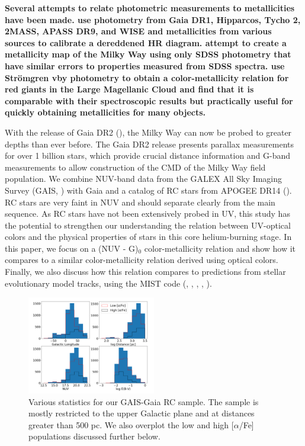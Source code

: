 \documentclass[twocolumn]{emulateapj}
\begin{document}
\textbf{Several attempts to relate photometric measurements to metallicities have been made. \citealt{ruiz18} use photometry from Gaia DR1, Hipparcos, Tycho 2, 2MASS, APASS DR9, and WISE and metallicities from various sources to calibrate a dereddened HR diagram. \citealt{ivezic2008} attempt to create a metallicity map of the Milky Way using only SDSS photometry that have similar errors to properties measured from SDSS spectra. \citealt{cole2000} use Str\"{o}mgren vby photometry to obtain a color-metallicity relation for red giants in the Large Magellanic Cloud and find that it is comparable with their spectroscopic results but practically useful for quickly obtaining metallicities for many objects.}

With the release of Gaia DR2 (\citealt{gaia}), the Milky Way can now be probed to greater depths than ever before. The Gaia DR2 release presents parallax measurements for over 1 billion stars, which provide crucial distance information and G-band measurements to allow construction of the CMD of the Milky Way field population. We combine NUV-band data from the GALEX All Sky Imaging Survey (GAIS, \citealt{galex}) with Gaia and a catalog of RC stars from APOGEE DR14 (\citealt{ting18}). RC stars are very faint in NUV and should separate clearly from the main sequence. As RC stars have not been extensively probed in UV, this study has the potential to strengthen our understanding the relation between UV-optical colors and the physical properties of stars in this core helium-burning stage. In this paper, we focus on a (NUV - G)$_0$ color-metallicity relation and show how it compares to a similar color-metallicity relation derived using optical colors. Finally, we also discuss how this relation compares to predictions from stellar evolutionary model tracks, using the MIST code (\citealt{mist}, \citealt{choi16}, \citealt{paxton11}, \citealt{paxton13}, \citealt{paxton15}).

\begin{figure}[] %
\centering
\includegraphics[width=0.5\textwidth]{f3.pdf}
\caption{Various statistics for our GAIS-Gaia RC sample. The sample is mostly restricted to the upper Galactic plane and at distances greater than 500 pc. We also overplot the low and high [$\alpha$/Fe] populations discussed further below.}
\end{figure}
\end{document}

